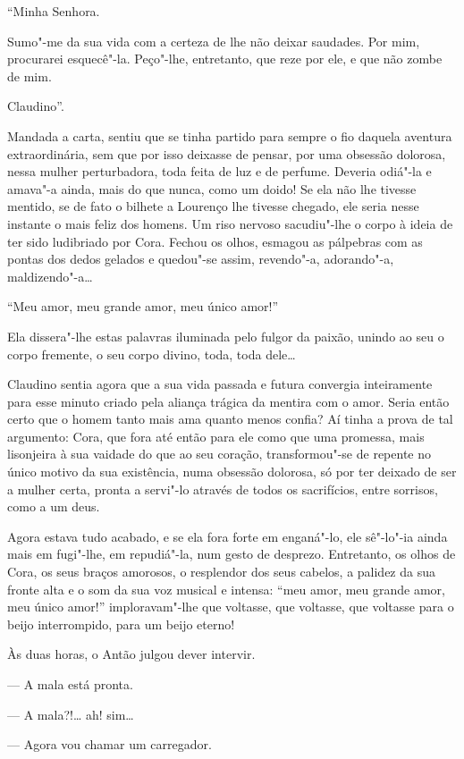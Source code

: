 ``Minha Senhora.

Sumo"-me da sua vida com a certeza de lhe não deixar saudades. Por mim,
procurarei esquecê"-la. Peço"-lhe, entretanto, que reze por ele, e que não
zombe de mim.

Claudino''.

Mandada a carta, sentiu que se tinha partido para sempre o fio daquela
aventura extraordinária, sem que por isso deixasse de pensar, por uma
obsessão dolorosa, nessa mulher perturbadora, toda feita de luz e de
perfume. Deveria odiá"-la e amava"-a ainda, mais do que nunca, como um
doido! Se ela não lhe tivesse mentido, se de fato o bilhete a Lourenço
lhe tivesse chegado, ele seria nesse instante o mais feliz dos homens.
Um riso nervoso sacudiu"-lhe o corpo à ideia de ter sido ludibriado por
Cora. Fechou os olhos, esmagou as pálpebras com as pontas dos dedos
gelados e quedou"-se assim, revendo"-a, adorando"-a, maldizendo"-a\ldots{}

``Meu amor, meu grande amor, meu único amor!''

Ela dissera"-lhe estas palavras iluminada pelo fulgor da paixão, unindo
ao seu o corpo fremente, o seu corpo divino, toda, toda dele\ldots{}

Claudino sentia agora que a sua vida passada e futura convergia
inteiramente para esse minuto criado pela aliança trágica da mentira com
o amor. Seria então certo que o homem tanto mais ama quanto menos
confia? Aí tinha a prova de tal argumento: Cora, que fora até então para
ele como que uma promessa, mais lisonjeira à sua vaidade do que ao seu
coração, transformou"-se de repente no único motivo da sua existência,
numa obsessão dolorosa, só por ter deixado de ser a mulher certa, pronta
a servi"-lo através de todos os sacrifícios, entre sorrisos, como a um
deus.

Agora estava tudo acabado, e se ela fora forte em enganá"-lo, ele
sê"-lo"-ia ainda mais em fugi"-lhe, em repudiá"-la, num gesto de desprezo.
Entretanto, os olhos de Cora, os seus braços amorosos, o resplendor dos
seus cabelos, a palidez da sua fronte alta e o som da sua voz musical e
intensa: ``meu amor, meu grande amor, meu único amor!'' imploravam"-lhe
que voltasse, que voltasse, que voltasse para o beijo interrompido, para
um beijo eterno!

Às duas horas, o Antão julgou dever intervir.

--- A mala está pronta.

--- A mala?!\ldots{} ah! sim\ldots{}

--- Agora vou chamar um carregador.

